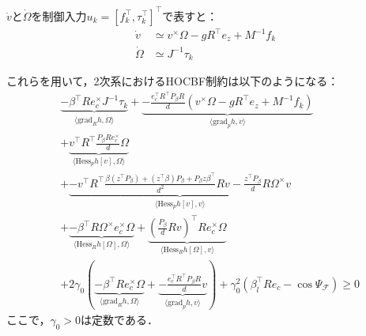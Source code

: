 $\dot{v}$と$\dot{\Omega}$を制御入力$u_k = [f_k^\top, \tau_k^\top]^\top$で表すと：
\begin{equation}
\begin{aligned}
\dot{v} &\simeq v^\times \Omega - g R^\top e_z + M^{-1} f_k \\
\dot{\Omega} &\simeq J^{-1} \tau_k
\label{eq:acceleration}
\end{aligned}
\end{equation}

これらを用いて，2次系におけるHOCBF制約は以下のようになる：
\begin{equation}
\begin{aligned}
&\underbrace{-\beta^\top R e_c^\times J^{-1} \tau_k}_{\langle \mathrm{grad}_R h, \dot{\Omega} \rangle} + \underbrace{-\frac{e_c^\top R^\top P_\beta R}{d} (v^\times \Omega - g R^\top e_z + M^{-1} f_k)}_{\langle \mathrm{grad}_p h, \dot{v} \rangle} \\
&+ \underbrace{v^\top R^\top \frac{P_\beta R e_c^\times}{d} \Omega}_{\langle \mathrm{Hess}_p h[v], \Omega \rangle} \\
&+ \underbrace{-v^\top R^\top \frac{\beta (z^\top P_\beta) + (z^\top \beta) P_\beta + P_\beta z \beta^\top}{d^2} R v - \frac{z^\top P_\beta}{d} R \Omega^\times v}_{\langle \mathrm{Hess}_p h[v], v \rangle} \\
&+ \underbrace{-\beta^\top R \Omega^\times e_c^\times \Omega}_{\langle \mathrm{Hess}_R h[\Omega], \Omega \rangle} + \underbrace{\left(\frac{P_\beta}{d} R v\right)^\top R e_c^\times \Omega}_{\langle \mathrm{Hess}_R h[\Omega], v \rangle} \\
&+ 2\gamma_0 \left(\underbrace{-\beta^\top R e_c^\times \Omega}_{\langle \mathrm{grad}_R h, \Omega \rangle} + \underbrace{-\frac{e_c^\top R^\top P_\beta R}{d} v}_{\langle \mathrm{grad}_p h, v \rangle}\right) + \gamma_0^2 (\beta_l^\top R e_c - \cos\Psi_\mathcal{F}) \geq 0
\label{eq:single_hocbf_constraint}
\end{aligned}
\end{equation}
ここで，$\gamma_0 > 0$は定数である．

